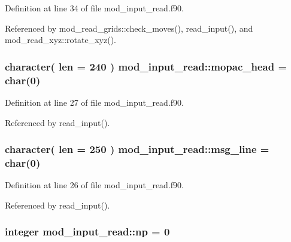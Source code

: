 Definition at line 34 of file mod\+\_\+input\+\_\+read.\+f90.



Referenced by mod\+\_\+read\+\_\+grids\+::check\+\_\+moves(), read\+\_\+input(), and mod\+\_\+read\+\_\+xyz\+::rotate\+\_\+xyz().

\subsubsection[{\texorpdfstring{mopac\+\_\+head}{mopac_head}}]{\setlength{\rightskip}{0pt plus 5cm}character( len = 240 ) mod\+\_\+input\+\_\+read\+::mopac\+\_\+head = char(0)}\hypertarget{namespacemod__input__read_a21db2c7c0ef283f45a6893ca2bf9a34a}{}\label{namespacemod__input__read_a21db2c7c0ef283f45a6893ca2bf9a34a}


Definition at line 27 of file mod\+\_\+input\+\_\+read.\+f90.



Referenced by read\+\_\+input().

\subsubsection[{\texorpdfstring{msg\+\_\+line}{msg_line}}]{\setlength{\rightskip}{0pt plus 5cm}character( len = 250 ) mod\+\_\+input\+\_\+read\+::msg\+\_\+line = char(0)}\hypertarget{namespacemod__input__read_a2aa6f72008491094c0c96753d8d63d2e}{}\label{namespacemod__input__read_a2aa6f72008491094c0c96753d8d63d2e}


Definition at line 26 of file mod\+\_\+input\+\_\+read.\+f90.



Referenced by read\+\_\+input().

\subsubsection[{\texorpdfstring{np}{np}}]{\setlength{\rightskip}{0pt plus 5cm}integer mod\+\_\+input\+\_\+read\+::np = 0}\hypertarget{namespacemod__input__read_a4f57e5d94eb06921bf584303b54c88f4}{}\label{namespacemod__input__read_a4f57e5d94eb06921bf584303b54c88f4}


